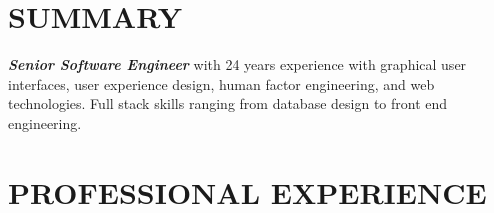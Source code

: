 \documentclass[margin,line]{resume}
\begin{document}
\begin{resume}

    \vspace{-3mm}

    \section{\mysidestyle \textbf{\large{S}\small{UMMARY}}}

    \textbf{\textsl{Senior Software Engineer}} with 24 years experience  with graphical  user interfaces, user experience design, human factor engineering, and web technologies.  Full stack skills ranging from database design to front end engineering.\vspace{-1mm}

\sectionline

    \section{\mysidestyle \textbf{\large{P}\small{ROFESSIONAL} \large{E}\small{XPERIENCE}}}


\end{resume}
\end{document}
